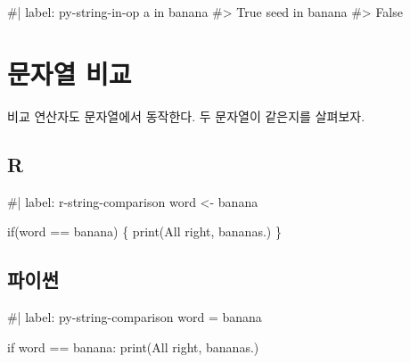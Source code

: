\documentclass[
  letterpaper,
]{book}
\newenvironment{Shaded}{\begin{snugshade}}{\end{snugshade}}
\newcommand{\NormalTok}[1]{\textcolor[rgb]{0.00,0.23,0.31}{#1}}
\begin{document}
\begin{Shaded}
\begin{Highlighting}[]
\NormalTok{\#| label: py{-}string{-}in{-}op}
\NormalTok{\textquotesingle{}a\textquotesingle{} in \textquotesingle{}banana\textquotesingle{}}
\NormalTok{\#\textgreater{} True}
\NormalTok{\textquotesingle{}seed\textquotesingle{} in \textquotesingle{}banana\textquotesingle{}}
\NormalTok{\#\textgreater{} False}
\end{Highlighting}
\end{Shaded}

\section{문자열 비교}\label{r-string-comparison-operator}

 

비교 연산자도 문자열에서 동작한다. 두 문자열이 같은지를 살펴보자.

\subsection{R}

\begin{Shaded}
\begin{Highlighting}[]
\NormalTok{\#| label: r{-}string{-}comparison}
\NormalTok{word \textless{}{-} \textquotesingle{}banana\textquotesingle{}}

\NormalTok{if(word == \textquotesingle{}banana\textquotesingle{}) \{}
\NormalTok{  print(\textquotesingle{}All right, bananas.\textquotesingle{})}
\NormalTok{\}}
\end{Highlighting}
\end{Shaded}

\subsection{파이썬}

\begin{Shaded}
\begin{Highlighting}[]
\NormalTok{\#| label: py{-}string{-}comparison}
\NormalTok{word = \textquotesingle{}banana\textquotesingle{}}

\NormalTok{if word == \textquotesingle{}banana\textquotesingle{}:}
\NormalTok{    print(\textquotesingle{}All right, bananas.\textquotesingle{})}
\end{Highlighting}
\end{Shaded}
\end{document}
